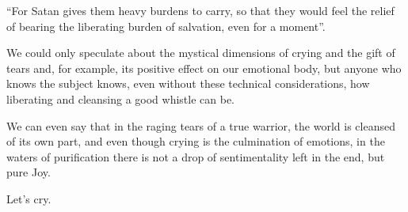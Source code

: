 \begin{footnotesize}
\begin{sffamily}
``For Satan gives them heavy burdens to carry, so that they would feel the relief of bearing the liberating burden of salvation, even for a moment''.

We could only speculate about the mystical dimensions of crying and the gift of tears and, for example, its positive effect on our emotional body, but anyone who knows the subject knows, even without these technical considerations, how liberating and cleansing a good whistle can be.

We can even say that in the raging tears of a true warrior, the world is cleansed of its own part, and even though crying is the culmination of emotions, in the waters of purification there is not a drop of sentimentality left in the end, but pure Joy.

Let's cry.

\end{sffamily}
\end{footnotesize}

